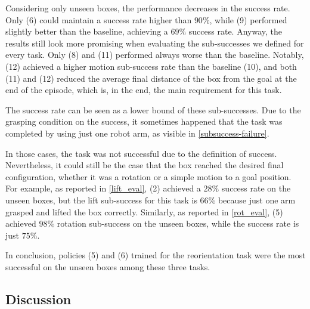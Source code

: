 \documentclass[letterpaper, 10 pt, conference]{ieeeconf}  %
\begin{document}
Considering only unseen boxes, the performance decreases in the success rate. Only (6) could maintain a success rate higher than $90\%$, while (9) performed slightly better than the baseline, achieving a $69\%$ success rate.
Anyway, the results still look more promising when evaluating the sub-successes we defined for every task. 
Only (8) and (11) performed always worse than the baseline. 
Notably, (12) achieved a higher motion sub-success rate than the baseline (10), and both (11) and (12) reduced the average final distance of the box from the goal at the end of the episode, which is, in the end, the main requirement for this task.

The success rate can be seen as a lower bound of these sub-successes. Due to the grasping condition on the success, it sometimes happened that the task was completed by using just one robot arm, as visible in \cref{subsuccess-failure}.

In those cases, the task was not successful due to the definition of success. 
Nevertheless, it could still be the case that the box reached the desired final configuration, whether it was a rotation or a simple motion to a goal position.
For example, as reported in \cref{lift_eval}, (2) achieved a $28\%$ success rate on the unseen boxes, but the lift sub-success for this task is $66\%$ because just one arm grasped and lifted the box correctly. 
Similarly, as reported in \cref{rot_eval}, (5) achieved $98\%$ rotation sub-success on the unseen boxes, while the success rate is just $75\%$.

In conclusion, policies (5) and (6) trained for the reorientation task were the most successful on the unseen boxes among these three tasks.

\subsection{Discussion}
\end{document}
